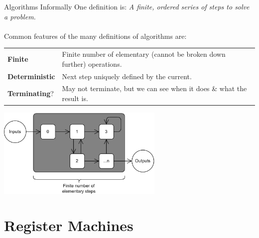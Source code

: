 \begin{definitionbox}{Algorithms Informally}
	One definition is: \textit{A finite, ordered series of steps to solve a problem.}
	\\
	\\ Common features of the many definitions of algorithms are:
    \begin{center}
        \begin{tabular}{l p{}}
            \textbf{Finite} & Finite number of elementary (cannot be broken down further) operations. \\
            \textbf{Deterministic} & Next step uniquely defined by the current. \\
            \textbf{Terminating}? & May not terminate, but we can see when it does \& what the result is. \\
        \end{tabular}
    \end{center}
    \begin{center}
        \includegraphics[width=0.6\textwidth]{register_machines/images/algorithm.drawio.png}
    \end{center}
\end{definitionbox}

\section{Register Machines}

